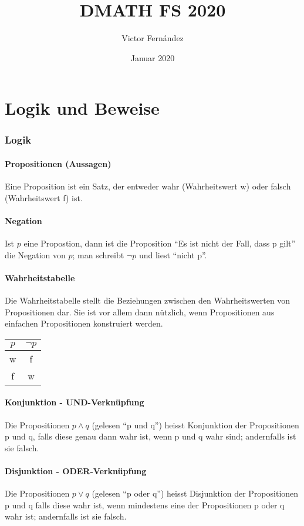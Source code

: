 \documentclass[12pt,a4paper]{article}
\title{DMATH FS 2020}
\author{Victor Fernández}
\date{Januar 2020}
\begin{document}
\maketitle
\tableofcontents
\thispagestyle{empty}
\pagebreak

\part{Logik und Beweise}
\section{Logik}
\subsection{Propositionen (Aussagen)}Eine Proposition ist ein Satz, der entweder wahr (Wahrheitswert w) oder falsch (Wahrheitswert f) ist.
\subsection{Negation}Ist $p$ eine Propostion, dann ist die Proposition "`Es ist nicht der Fall, dass p gilt"' die Negation von $p$; man schreibt $\neg p$ und liest "`nicht p"'.

\subsection{Wahrheitstabelle}Die Wahrheitstabelle stellt die Beziehungen zwischen den Wahrheitswerten von Propositionen dar. Sie ist vor allem dann nützlich, wenn Propositionen aus einfachen Propositionen konstruiert werden.\\
\begin{tabular}{|c|c|}
    \hline
        $p$&$\neg p$\\
        \hline
        w&f\\
        f&w\\
    \hline
\end{tabular}

\subsection{Konjunktion - UND-Verknüpfung}Die Propositionen $p\wedge q$ (gelesen "`p und q"') heisst Konjunktion der Propositionen p und q, falls diese genau dann wahr ist, wenn p und q wahr sind; andernfalls ist sie falsch.

\subsection{Disjunktion - ODER-Verknüpfung}Die Propositionen $p\vee q$ (gelesen "`p oder q"') heisst Disjunktion der Propositionen p und q falls diese wahr ist, wenn mindestens eine der Propositionen p oder q wahr ist; andernfalls ist sie falsch.
\end{document}
